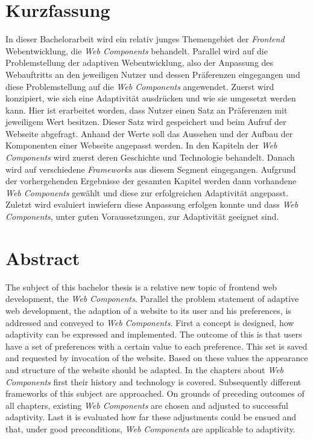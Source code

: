 \documentclass[12pt, paper=a4, bibtotoc, toc=listof, headsepline=true, numbers=endperiod]{scrreprt}
\begin{document}









\chapter*{Kurzfassung}
In dieser Bachelorarbeit wird ein relativ junges Themengebiet der \emph{Frontend} Webentwicklung, die \emph{Web Components} behandelt. Parallel wird auf die Problemstellung der adaptiven Webentwicklung, also der Anpassung des Webauftritts an den jeweiligen Nutzer und dessen Präferenzen eingegangen und diese Problemstellung auf die \emph{Web Components} angewendet. Zuerst wird konzipiert, wie sich eine Adaptivität ausdrücken und wie sie umgesetzt werden kann. Hier ist erarbeitet worden, dass Nutzer einen Satz an Präferenzen mit jeweiligem Wert besitzen. Dieser Satz wird gespeichert und beim Aufruf der Webseite abgefragt. Anhand der Werte soll das Aussehen und der Aufbau der Komponenten einer Webseite angepasst werden.
In den Kapiteln der \emph{Web Components} wird zuerst deren Geschichte und Technologie behandelt. Danach wird auf verschiedene \emph{Frameworks} aus diesem Segment eingegangen. Aufgrund der vorhergehenden Ergebnisse der gesamten Kapitel werden dann vorhandene \emph{Web Components} gewählt und diese zur erfolgreichen Adaptivität angepasst. Zuletzt wird evaluiert inwiefern diese Anpassung erfolgen konnte und dass \emph{Web Components}, unter guten Voraussetzungen, zur Adaptivität geeignet sind.
{\let\clearpage\relax \chapter*{Abstract}}
The subject of this bachelor thesis is a relative new topic of frontend web development, the \emph{Web Components}. Parallel the problem statement of adaptive web development, the adaption of a website to its user and his preferences, is addressed and conveyed to \emph{Web Components}. First a concept is designed, how adaptivity can be expressed and implemented. The outcome of this is that users have a set of preferences with a certain value to each preference. This set is saved and requested by invocation of the website. Based on these values the appearance and structure of the website should be adapted. In the chapters about \emph{Web Components} first their history and technology is covered. Subsequently different frameworks of this subject are approached. On grounds of preceding outcomes of all chapters, existing \emph{Web Components} are chosen and adjusted to successful adaptivity. Last it is evaluated how far these adjustments could be ensued and that, under good preconditions, \emph{Web Components} are applicable to adaptivity.
\end{document}
